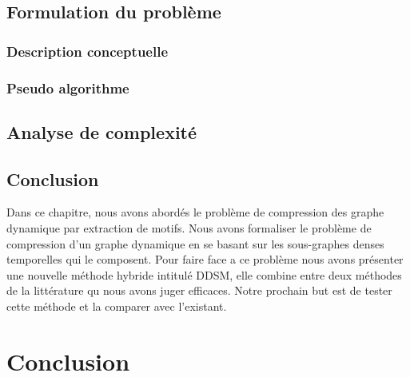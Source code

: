 \documentclass[a4paper,oneside,12pt]{report}
\theoremstyle{definition}
\newtheorem{defn}{Definition}[section]
\begin{document}
		\section{Formulation du problème}
			\subsection{Description conceptuelle}
			\subsection{Pseudo algorithme}
		\section{Analyse de complexité}
		\section{Conclusion}
Dans ce chapitre, nous avons abordés le problème de compression des graphe dynamique par extraction de motifs. Nous avons formaliser le problème de compression d'un graphe dynamique en se basant sur les sous-graphes denses temporelles qui le composent. Pour faire face a ce problème nous avons présenter une nouvelle méthode hybride intitulé DDSM, elle combine entre deux méthodes de la littérature qu nous avons juger efficaces. Notre prochain but est de tester cette méthode et la comparer avec l'existant.   
	
	
	
	
	

\chapter{Conclusion} 




\newpage


\end{document}

